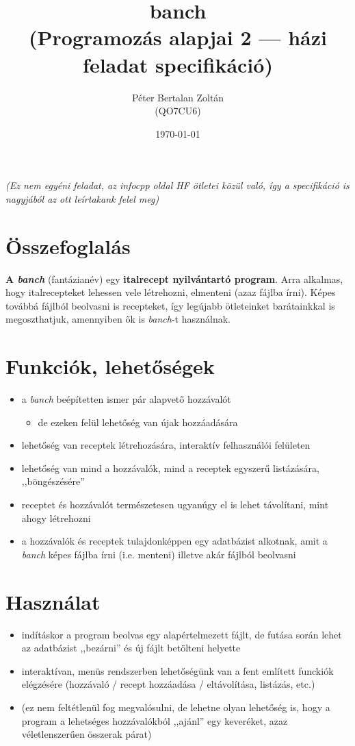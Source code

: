 \documentclass[a4paper,draft]{article}
\title{\Huge banch \\ \small (Programozás alapjai 2 --- házi feladat specifikáció)}
\date{\today}
\author{Péter Bertalan Zoltán \\ (QO7CU6)}
\begin{document}
\maketitle

\thispagestyle{fancy}

\noindent \textit{(Ez nem egyéni feladat, az infocpp oldal HF ötletei közül való, így a specifikáció is nagyjából az ott leírtakank felel meg)}

\section*{Összefoglalás}

\textbf{A \emph{banch}} (fantázianév) egy \textbf{italrecept nyilvántartó program}. Arra alkalmas, hogy italrecepteket lehessen vele létrehozni, elmenteni (azaz fájlba írni). Képes továbbá fájlból beolvasni is recepteket, így legújabb ötleteinket barátainkkal is megoszthatjuk, amennyiben ők is \emph{banch}-t használnak.

\section*{Funkciók, lehetőségek}

\begin{itemize}
	\item a \emph{banch} beépítetten ismer pár alapvető hozzávalót
		\begin{itemize}
			\item de ezeken felül lehetőség van újak hozzáadására
		\end{itemize}
	\item lehetőség van receptek létrehozására, interaktív felhasználói felületen
	\item lehetőség van mind a hozzávalók, mind a receptek egyszerű listázására, ,,böngészésére''
	\item receptet és hozzávalót természetesen ugyanúgy el is lehet távolítani, mint ahogy létrehozni
	\item a hozzávalók és receptek tulajdonképpen egy adatbázist alkotnak, amit a \emph{banch} képes fájlba írni (i.e. menteni) illetve akár fájlból beolvasni
\end{itemize}

\section*{Használat}

\begin{itemize}
	\item indításkor a program beolvas egy alapértelmezett fájlt, de futása során lehet az adatbázist ,,bezárni'' és új fájlt betölteni helyette
	\item interaktívan, menüs rendszerben lehetőségünk van a fent említett funckiók elégzésére (hozzávaló / recept hozzáadása / eltávolítása, listázás, etc.)
	\item (ez nem feltétlenül fog megvalósulni, de lehetne olyan lehetőség is, hogy a program a lehetséges hozzávalókból ,,ajánl'' egy keveréket, azaz véletlenszerűen összerak párat)
\end{itemize}
\end{document}
